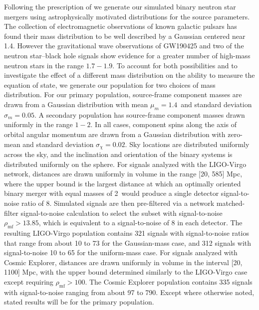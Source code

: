 Following the prescription of \cite{Agathos:2015uaa} we generate our simulated binary neutron star mergers using astrophysically motivated distributions for the source parameters. The collection of electromagnetic observations of known galactic pulsars has found their mass distribution to be well described by a Gaussian centered near 1.4\msun. However the gravitational wave observations of GW190425 and two of the neutron star--black hole signals show evidence for a greater number of high-mass neutron stars in the range $1.7-1.9$\msun. To account for both possibilities and to investigate the effect of a different mass distribution on the ability to measure the equation of state, we generate our population for two choices of mass distribution. For our primary population, source-frame component masses are drawn from a Gaussian distribution with mean $\mu_{m}=1.4$\msun~and standard deviation $\sigma_{m}=0.05$\msun. A secondary population has source-frame component masses drawn uniformly in the range $1-2$\msun. In all cases, component spins along the axis of orbital angular momentum are drawn from a Gaussian distribution with zero-mean and standard deviation $\sigma_{\chi}=0.02$. Sky locations are distributed uniformly across the sky, and the inclination and orientation of the binary systems is distributed uniformly on the sphere. For signals analyzed with the LIGO-Virgo network, distances are drawn uniformly in volume in the range [20, 585] Mpc, where the upper bound is the largest distance at which an optimally oriented binary merger with equal masses of 2\msun~would produce a single detector signal-to-noise ratio of 8. Simulated signals are then pre-filtered via a network matched-filter signal-to-noise calculation to select the subset with signal-to-noise $\rho_{\mathrm{mf}}>13.85$, which is equivalent to a signal-to-noise of 8 in each detector. The resulting LIGO-Virgo population contains 321 signals with signal-to-noise ratios that range from about 10 to 73 for the Gaussian-mass case, and 312 signals with signal-to-noise 10 to 65 for the uniform-mass case. For signals analyzed with Cosmic Explorer, distances are drawn uniformly in volume in the interval [20, 1100] Mpc, with the upper bound determined similarly to the LIGO-Virgo case except requiring $\rho_{\mathrm{mf}}>100$. The Cosmic Explorer population contains 335 signals with signal-to-noise ranging from about 97 to 790. Except where otherwise noted, stated results will be for the primary population.

